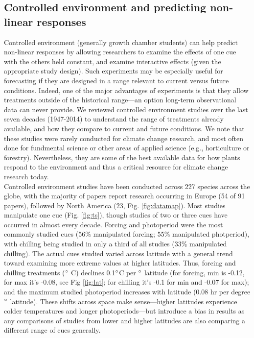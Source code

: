 \documentclass[11pt,letter]{article}
\begin{document}
\subsection{Controlled environment and predicting non-linear responses} %

Controlled environment (generally growth chamber students) can help predict non-linear responses by allowing researchers to examine the effects of one cue with the others held constant, and examine interactive effects (given the appropriate study design). Such experiments may be especially useful for forecasting if they are designed in a range relevant to current versus future conditions. Indeed, one of the major advantages of experiments is that they allow treatments outside of the historical range---an option long-term observational data can never provide. We reviewed controlled environment studies over the last seven decades (1947-2014) to understand the range of treatments already available, and how they compare to current and future conditions. We note that these studies were rarely conducted for climate change research, and most often done for fundmental science or other areas of applied science (e.g., horticulture or forestry). Nevertheless, they are some of the best available data for how plants respond to the environment and thus a critical resource for climate change research today.\\

Controlled environment studies have been conducted across 227 species across the globe, with the majority of papers report research occurring in Europe (54 of 91 papers), followed by North America (23, Fig. \ref{fig:datamap}). Most studies manipulate one cue (Fig. \ref{fig:ts}), though studies of two or three cues have occurred in almost every decade. Forcing and photoperiod were the most commonly studied cues (56\% manipulated forcing; 55\% manipulated photperiod), with chilling being studied in only a third of all studies (33\% manipulated chilling). The actual cues studied varied across latitude with a general trend toward examining more extreme values at higher latitudes. Thus, forcing and chilling treatments ($\degree$ C) declines 0.1$\degree$C per $\degree$ latitude (for forcing, min is -0.12, for max it's -0.08, see Fig \ref{fig:lat}; for chilling it's -0.1 for min and -0.07 for max); and the maximum studied photoperiod increases with latitude (0.08 hr per degree $\degree$ latitude). These shifts across space make sense---higher latitudes experience colder temperatures and longer photoperiods---but introduce a bias in results as any comparisons of studies from lower and higher latitudes are also comparing a different range of cues generally. \\
\end{document}
